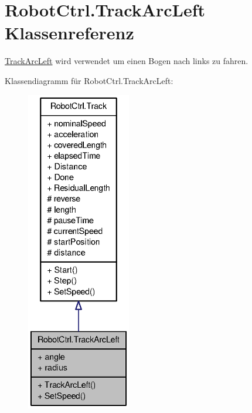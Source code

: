 \hypertarget{class_robot_ctrl_1_1_track_arc_left}{
\section{RobotCtrl.TrackArcLeft Klassenreferenz}
\label{class_robot_ctrl_1_1_track_arc_left}
}


\hyperlink{class_robot_ctrl_1_1_track_arc_left}{TrackArcLeft} wird verwendet um einen Bogen nach links zu fahren.  




Klassendiagramm für RobotCtrl.TrackArcLeft:\nopagebreak
\begin{figure}[H]
\begin{center}
\leavevmode
\includegraphics[height=400pt]{class_robot_ctrl_1_1_track_arc_left__inherit__graph}
\end{center}
\end{figure}


